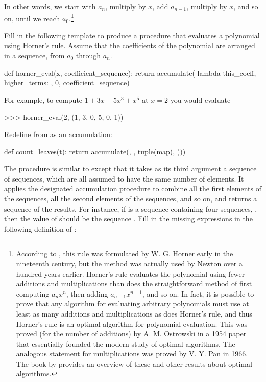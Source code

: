 \begin{exerciseGroup}
\noindent
In other words, we start with \( a_n \), multiply by \( x \), add \( a_{n-1}
\), multiply by \( x \), and so on, until we reach \( a_0
\).\footnote{According to , this rule was formulated by W. G.
Horner early in the nineteenth century, but the method was actually used by
Newton over a hundred years earlier.  Horner's rule evaluates the polynomial
using fewer additions and multiplications than does the straightforward method
of first computing \( a_n x^n \), then adding \( a_{n-1}x^{n-1} \), and so on.
In fact, it is possible to prove that any algorithm for evaluating arbitrary
polynomials must use at least as many additions and multiplications as does
Horner's rule, and thus Horner's rule is an optimal algorithm for polynomial
evaluation.  This was proved (for the number of additions) by A. M. Ostrowski
in a 1954 paper that essentially founded the modern study of optimal
algorithms.  The analogous statement for multiplications was proved by V. Y.
Pan in 1966.  The book by  provides an overview
of these and other results about optimal algorithms.}

Fill in the following template to produce a procedure that evaluates a
polynomial using Horner's rule.  Assume that the coefficients of the polynomial
are arranged in a sequence, from \( a_0 \) through \( a_n \).

\begin{syntaxForm}
def horner_eval(x, coefficient_sequence):
    return accumulate(
        lambda this_coeff, higher_terms: ,
        0,
        coefficient_sequence)
\end{syntaxForm}

For example, to compute \( 1 + 3x + 5x^3 + x^5 \) at \( x = 2 \) you
would evaluate

\begin{codeBlock}
>>> horner_eval(2, (1, 3, 0, 5, 0, 1))
\end{codeBlock}

\label{Exercise 2.35}
 Redefine  from
 as an accumulation:

\begin{syntaxForm}
def count_leaves(t):
    return accumulate(, , tuple(map(, )))
\end{syntaxForm}

\label{Exercise 2.36}
 The procedure 
is similar to  except that it takes as its third argument a
sequence of sequences, which are all assumed to have the same number of
elements.  It applies the designated accumulation procedure to combine all the
first elements of the sequences, all the second elements of the sequences, and
so on, and returns a sequence of the results.  For instance, if  is a
sequence containing four sequences, , then the value of  should be the
sequence .  Fill in the missing expressions in the following
definition of :


\end{exerciseGroup}
